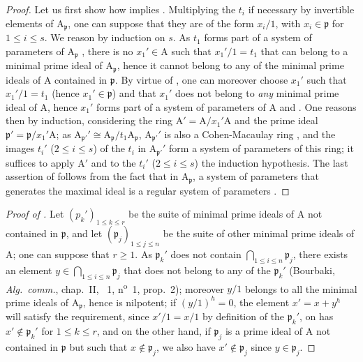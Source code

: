 \begin{proof}
Let us first show how  implies .
Multiplying the $t_i$ if necessary by invertible elements of $\mathrm{A}_\mathfrak{p}$, one can suppose that they are of the form $x_i/1$, with $x_i\in\mathfrak{p}$ for $1\leq i\leq s$.
We reason by induction on $s$.
As $t_1$ forms part of a system of parameters of $\mathrm{A}_\mathfrak{p}$ , there is no $x_1'\in\mathrm{A}$ such that $x_1'/1=t_1$ that can belong to a minimal prime ideal of $\mathrm{A}_\mathfrak{p}$, hence it cannot belong to any of the minimal prime ideals of $\mathrm{A}$ contained in $\mathfrak{p}$.
By virtue of , one can moreover choose $x_1'$ such that $x_1'/1=t_1$ (hence $x_1'\in\mathfrak{p}$) and that $x_1'$ does not belong to \emph{any} minimal prime ideal of $\mathrm{A}$, hence $x_1'$ forms part of a system of parameters of $\mathrm{A}$  and .
One reasons then by induction, considering the ring $\mathrm{A}'=\mathrm{A}/x_1'\mathrm{A}$ and the prime ideal $\mathfrak{p}'=\mathfrak{p}/x_1'\mathrm{A}$; as $\mathrm{A}_{\mathfrak{p}'}'\cong\mathrm{A}_\mathfrak{p}/t_1\mathrm{A}_\mathfrak{p}$, $\mathrm{A}_{\mathfrak{p}'}'$ is also a Cohen-Macaulay ring , and the images $t_i'$ ($2\leq i\leq s$) of the $t_i$ in $\mathrm{A}_{\mathfrak{p}'}'$ form a system of parameters of this ring; it suffices to apply $\mathrm{A}'$ and to the $t_i'$ ($2\leq i\leq s$) the induction hypothesis.
The last assertion of  follows from the fact that in $\mathrm{A}_\mathfrak{p}$, a system of parameters that generates the maximal ideal is a regular system of parameters .
\end{proof}

\begin{proof}[Proof of ]
Let $(p_k')_{1\leq k\leq r}$ be the suite of minimal prime ideals of $\mathrm{A}$ not contained in $\mathfrak{p}$, and let $(\mathfrak{p}_j)_{1\leq j\leq n}$ be the suite of other minimal prime ideals of $\mathrm{A}$; one can suppose that $r\geq 1$.
As $\mathfrak{p}_k'$ does not contain $\bigcap_{1\leq i\leq n}\mathfrak{p}_j$, there exists an element $y\in\bigcap_{1\leq i\leq n}\mathfrak{p}_j$ that does not belong to any of the $\mathfrak{p}_k'$ (Bourbaki, \emph{Alg.\ comm.}, chap.~II, \textsection~1, n\textsuperscript{o}~1, prop.~2); moreover $y/1$ belongs to all the minimal prime ideals of $\mathrm{A}_\mathfrak{p}$, hence is nilpotent; if $(y/1)^h=0$, the element $x'=x+y^h$ will satisfy the requirement, since $x'/1=x/1$ by definition of the $\mathfrak{p}_k'$, on has $x'\notin\mathfrak{p}_k'$ for $1\leq k\leq r$, and on the other hand, if $\mathfrak{p}_j$ is a prime ideal of $\mathrm{A}$ not contained in $\mathfrak{p}$ but such that $x\notin\mathfrak{p}_j$, we also have $x'\notin\mathfrak{p}_j$ since $y\in\mathfrak{p}_j$.
\end{proof}

